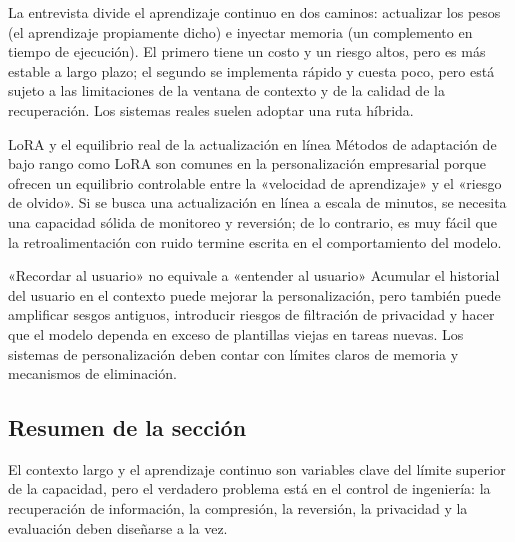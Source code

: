 La entrevista divide el aprendizaje continuo en dos caminos: actualizar los pesos (el aprendizaje propiamente dicho) e inyectar memoria (un complemento en tiempo de ejecución). El primero tiene un costo y un riesgo altos, pero es más estable a largo plazo; el segundo se implementa rápido y cuesta poco, pero está sujeto a las limitaciones de la ventana de contexto y de la calidad de la recuperación. Los sistemas reales suelen adoptar una ruta híbrida.

\begin{knowledgebox}{LoRA y el equilibrio real de la actualización en línea}
Métodos de adaptación de bajo rango como LoRA son comunes en la personalización empresarial porque ofrecen un equilibrio controlable entre la «velocidad de aprendizaje» y el «riesgo de olvido». Si se busca una actualización en línea a escala de minutos, se necesita una capacidad sólida de monitoreo y reversión; de lo contrario, es muy fácil que la retroalimentación con ruido termine escrita en el comportamiento del modelo.
\end{knowledgebox}

\begin{warningbox}{«Recordar al usuario» no equivale a «entender al usuario»}
Acumular el historial del usuario en el contexto puede mejorar la personalización, pero también puede amplificar sesgos antiguos, introducir riesgos de filtración de privacidad y hacer que el modelo dependa en exceso de plantillas viejas en tareas nuevas. Los sistemas de personalización deben contar con límites claros de memoria y mecanismos de eliminación.
\end{warningbox}

\subsection{Resumen de la sección}

El contexto largo y el aprendizaje continuo son variables clave del límite superior de la capacidad, pero el verdadero problema está en el control de ingeniería: la recuperación de información, la compresión, la reversión, la privacidad y la evaluación deben diseñarse a la vez.

